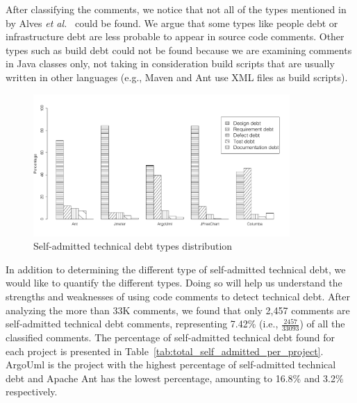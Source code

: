 After classifying the comments, we notice that not all of the types mentioned in by Alves \emph{et al.}~\cite{Alves2014MTD} could be found. We argue that some types like people debt or infrastructure debt are less probable to appear in source code comments. Other types such as build debt could not be found because we are examining comments in Java classes only, not taking in consideration build scripts that are usually written in other languages (e.g., Maven and Ant use XML files as build scripts). 



\begin{figure}[thb!]
  \centering
  \includegraphics[width=0.87\textwidth]{figures/technical_debt_bw_low_freq.pdf}
  \vspace{-3mm}
  \caption{Self-admitted technical debt types distribution}
  \label{fig:satd_distribution}
\end{figure}

In addition to determining the different type of self-admitted technical debt, we would like to quantify the different types. Doing so will help us understand the strengths and weaknesses of using code comments to detect technical debt. After analyzing the more than 33K comments, we found that only 2,457 comments are self-admitted technical debt comments, representing 7.42\% (i.e., $\frac{2457}{33093}$) of all the classified comments. The percentage of self-admitted technical debt found for each project is presented in Table~\ref{tab:total_self_admitted_per_project}. ArgoUml is the project with the highest percentage of self-admitted technical debt and Apache Ant has the lowest percentage, amounting to 16.8\% and 3.2\% respectively.

